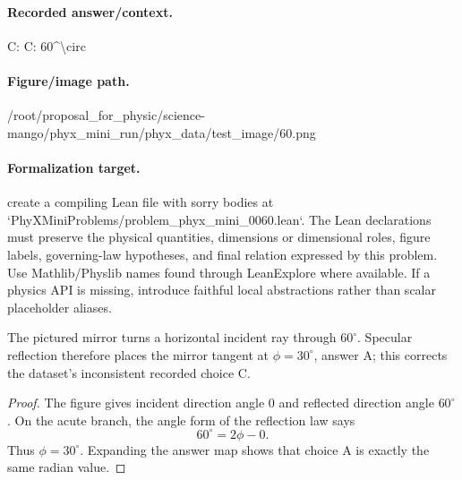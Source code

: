 \paragraph{Recorded answer/context.}
C: C: 60\textasciicircum{}\textbackslash{}circ

\paragraph{Figure/image path.}
/root/proposal\_for\_physic/science-mango/phyx\_mini\_run/phyx\_data/test\_image/60.png

\paragraph{Formalization target.}
create a compiling Lean file with sorry bodies at `PhyXMiniProblems/problem\_phyx\_mini\_0060.lean`. The Lean declarations must preserve the physical quantities, dimensions or dimensional roles, figure labels, governing-law hypotheses, and final relation expressed by this problem.
Use Mathlib/Physlib names found through LeanExplore where available. If a physics API is missing, introduce faithful local abstractions rather than scalar placeholder aliases.

\begin{theorem}
\label{thm:physics:phyx_mini_0060:target}
The pictured mirror turns a horizontal incident ray through \(60^\circ\).
Specular reflection therefore places the mirror tangent at
\(\phi=30^\circ\), answer A; this corrects the dataset's inconsistent recorded
choice C.
\end{theorem}
\begin{proof}
The figure gives incident direction angle \(0\) and reflected direction angle
\(60^\circ\).  On the acute branch, the angle form of the reflection law says
\[
 60^\circ=2\phi-0.
\]
Thus \(\phi=30^\circ\).  Expanding the answer map shows that choice A is
exactly the same radian value.
\end{proof}

